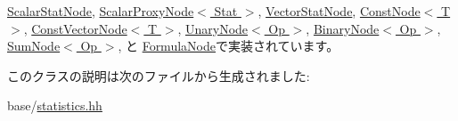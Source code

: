\hyperlink{classStats_1_1ScalarStatNode_a35c6e2ed3fc81b40d69052a062113ead}{ScalarStatNode}, \hyperlink{classStats_1_1ScalarProxyNode_a35c6e2ed3fc81b40d69052a062113ead}{ScalarProxyNode$<$ Stat $>$}, \hyperlink{classStats_1_1VectorStatNode_a35c6e2ed3fc81b40d69052a062113ead}{VectorStatNode}, \hyperlink{classStats_1_1ConstNode_a35c6e2ed3fc81b40d69052a062113ead}{ConstNode$<$ T $>$}, \hyperlink{classStats_1_1ConstVectorNode_a35c6e2ed3fc81b40d69052a062113ead}{ConstVectorNode$<$ T $>$}, \hyperlink{classStats_1_1UnaryNode_a35c6e2ed3fc81b40d69052a062113ead}{UnaryNode$<$ Op $>$}, \hyperlink{classStats_1_1BinaryNode_a35c6e2ed3fc81b40d69052a062113ead}{BinaryNode$<$ Op $>$}, \hyperlink{classStats_1_1SumNode_a35c6e2ed3fc81b40d69052a062113ead}{SumNode$<$ Op $>$}, と \hyperlink{classStats_1_1FormulaNode_a35c6e2ed3fc81b40d69052a062113ead}{FormulaNode}で実装されています。

このクラスの説明は次のファイルから生成されました:\begin{DoxyCompactItemize}
\item 
base/\hyperlink{statistics_8hh}{statistics.hh}\end{DoxyCompactItemize}
